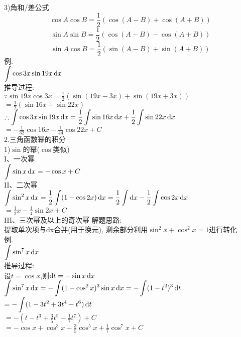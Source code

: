 3)角和/差公式\\
\[\cos A\cos B=\frac{1}{2}(\cos(A-B)+\cos(A+B))\]
\[\sin A\sin B=\frac{1}{2}(\cos(A-B)-\cos(A+B))\]
\[\sin A\cos B=\frac{1}{2}(\sin(A-B)+\sin(A+B))\]
例.\\
\phantom{例}$\displaystyle\int\cos3x\sin19x\mathop{}\!\mathrm{d} x$\\
推导过程:\\
$\displaystyle\because\sin19x\cos3x=\frac{1}{2}(\sin(19x-3x)+\sin(19x+3x))$\\
\phantom{$\displaystyle\because\sin19x\cos3x$}$\displaystyle=\frac{1}{2}(\sin16x+\sin22x)$\\
$\displaystyle\therefore\int\cos3x\sin19x\mathop{}\!\mathrm{d} x=\frac{1}{2}\int\sin16x\mathop{}\!\mathrm{d} x+\frac{1}{2}\int\sin22x\mathop{}\!\mathrm{d} x$\\
\phantom{$\displaystyle\therefore\int\cos3x\sin19x\dif x$}$\displaystyle=-\frac{1}{32}\cos16x-\frac{1}{44}\cos22x+C$\\[2ex]

2.三角函数幂的积分\\
1)$\sin$的幂($\cos$类似)\\
I、一次幂\\
$\displaystyle\int\sin x\mathop{}\!\mathrm{d} x=-\cos x+C$\\

II、二次幂\\
$\displaystyle\int\sin^2x\mathop{}\!\mathrm{d} x=\frac{1}{2}\int(1-\cos2x)\mathop{}\!\mathrm{d} x=\frac{1}{2}\int\mathop{}\!\mathrm{d} x-\frac{1}{2}\int\cos2x\mathop{}\!\mathrm{d} x$\\
\phantom{$\displaystyle\int\sin^2x\dif x$}$\displaystyle=\frac{1}{2}x-\frac{1}{4}\sin2x+C$\\

III、三次幂及以上的奇次幂
解题思路:\\
\phantom{解题}提取单次项与dx合并(用于换元), 剩余部分利用$\sin^2x+\cos^2x=1$进行转化\\
例.\\
\phantom{例}$\displaystyle\int\sin^7x\dif x$\\
推导过程:\\
设$t=\cos x$,则$\mathop{}\!\mathrm{d} t=-\sin x\mathop{}\!\mathrm{d} x$\\
$\displaystyle\int\sin^7x\mathop{}\!\mathrm{d} x=-\int(1-\cos^2x)^3\sin x\mathop{}\!\mathrm{d} x=-\int(1-t^2)^3\mathop{}\!\mathrm{d} t$\\
\phantom{$\displaystyle\int\sin^7x\dif x$}$\displaystyle=-\int(1-3t^2+3t^4-t^6)\mathop{}\!\mathrm{d} t$\\
\phantom{$\displaystyle\int\sin^7x\dif x$}$\displaystyle=-(t-t^3+\frac{3}{5}t^5-\frac{1}{7}t^7)+C$\\
\phantom{$\displaystyle\int\sin^7x\dif x$}$\displaystyle=-\cos x+\cos^3x-\frac{3}{5}\cos^5x+\frac{1}{7}\cos^7x+C$\\

